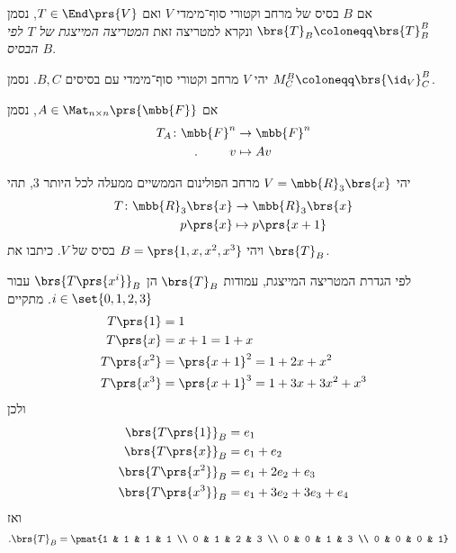 \documentclass[a4paper,10pt,twoside,openany]{book}
\begin{document}
\begin{notation}
אם
$B$
בסיס של מרחב וקטורי סוף־מימדי
$V$
ואם
$T \in \End\prs{V}$,
נסמן
$\brs{T}_B \coloneqq \brs{T}^B_B$
ונקרא למטריצה זאת
\emph{המטריצה המייצגת של
$T$
לפי הבסיס
$B$}.
\end{notation}

\begin{notation}
יהי
$V$
מרחב וקטורי סוף־מימדי עם בסיסים
$B,C$.
נסמן
$M^B_C \coloneqq \brs{\id_V}^B_C$.
\end{notation}

\begin{notation}
אם
$A \in \Mat_{n\times n}\prs{\mbb{F}}$,
נסמן
\begin{align*}
T_A \colon \mbb{F}^n &\to \mbb{F}^n \\
\text{.} \hphantom{lalala} v &\mapsto Av
\end{align*}
\end{notation}

\begin{exercisechap}\label{ex:p(x+1)}
יהי
$V = \mbb{R}_3\brs{x}$
מרחב הפולינום הממשיים ממעלה לכל היותר
$3$,
תהי
\begin{align*}
T \colon \mbb{R}_3\brs{x} &\to \mbb{R}_3\brs{x} \\
p\prs{x} &\mapsto p\prs{x+1}
\end{align*}
ויהי
$B = \prs{1,x,x^2,x^3}$
בסיס של
$V$.
כיתבו את
$\brs{T}_B$.
\end{exercisechap}

\begin{solution}
לפי הגדרת המטריצה המייצגת,
עמודות
$\brs{T}_B$
הן
$\brs{T\prs{x^i}}_B$
עבור
$i \in \set{0,1,2,3}$.
מתקיים
\begin{align*}
T\prs{1} &= 1 \\
T\prs{x} &= x+1 = 1 + x \\
T\prs{x^2} &= \prs{x+1}^2 = 1 + 2x + x^2 \\
T\prs{x^3} &= \prs{x+1}^3 = 1 + 3x + 3x^2 + x^3
\end{align*}
ולכן
\begin{align*}
\brs{T\prs{1}}_B &= e_1 \\
\brs{T\prs{x}}_B &= e_1 + e_2 \\
\brs{T\prs{x^2}}_B &= e_1 + 2 e_2 + e_3 \\
\brs{T\prs{x^3}}_B &= e_1 + 3 e_2 + 3 e_3 + e_4
\end{align*}
ואז
\begin{align*}
\text{.} \brs{T}_B &= \pmat{1 & 1 & 1 & 1 \\ 0 & 1 & 2 & 3 \\ 0 & 0 & 1 & 3 \\ 0 & 0 & 0 & 1}
\end{align*}
\end{solution}
\end{document}
